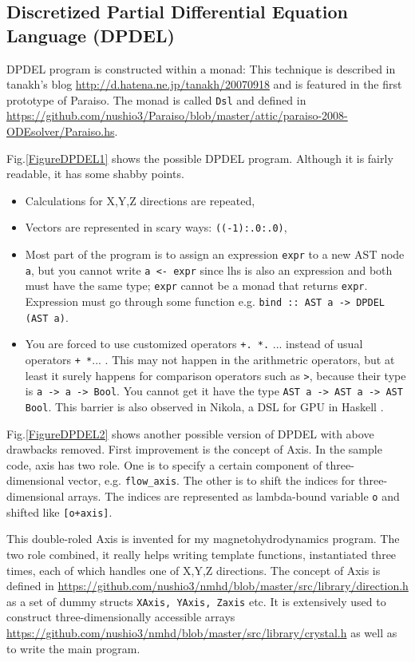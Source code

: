 \documentclass[twocolumn]{article}
\begin{document}
\subsection{Discretized Partial Differential Equation Language (DPDEL)}

DPDEL program is constructed within a monad: This technique is
described in tanakh's blog \url{http://d.hatena.ne.jp/tanakh/20070918}
and is featured in the first prototype of Paraiso. The monad is called
{\tt Dsl} and defined in
\url{https://github.com/nushio3/Paraiso/blob/master/attic/paraiso-2008-ODEsolver/Paraiso.hs}.


Fig.\ref{FigureDPDEL1} shows the possible DPDEL program. Although it is fairly
readable, it has some shabby points.
\begin{itemize}
  \item Calculations for X,Y,Z directions are repeated,
  \item Vectors are represented in scary ways: {\tt ((-1):.0:.0)},
  \item Most part of the program is to assign an expression {\tt expr} to a
    new AST node {\tt a}, but you cannot write {\tt a <- expr} since lhs is
    also an expression and both must have the same type; {\tt expr} cannot be
    a monad that returns {\tt expr}.  Expression must go through some function
    e.g. {\tt bind :: AST a -> DPDEL (AST a)}.
  \item You are forced to use customized operators {\tt+. *.} ... instead of
    usual operators {\tt+ *}... . This may not happen in the arithmetric
    operators, but at least it surely happens for comparison operators such as
    {\tt>}, because their type is {\tt a -> a -> Bool}. You cannot get it have
    the type {\tt AST a -> AST a -> AST Bool}. This barrier is also observed
    in Nikola, a DSL for GPU in Haskell
    \cite{Mainland:2010:NEC:1863523.1863533}.
\end{itemize}

Fig.\ref{FigureDPDEL2} shows another possible version of DPDEL with
above drawbacks removed.  First improvement is the concept of Axis. In
the sample code, axis has two role.  One is to specify a certain
component of three-dimensional vector, e.g. {\tt flow\_axis}. The
other is to shift the indices for three-dimensional arrays. The
indices are represented as lambda-bound variable {\tt o} and shifted
like {\tt [o+axis]}.

This double-roled Axis is invented for my magnetohydrodynamics
program. The two role combined, it really helps writing template
functions, instantiated three times, each of which handles one of
X,Y,Z directions. The concept of Axis is defined in
\url{https://github.com/nushio3/nmhd/blob/master/src/library/direction.h}
as a set of dummy structs {\tt XAxis, YAxis, Zaxis} etc. It is
extensively used to construct three-dimensionally accessible arrays
\url{https://github.com/nushio3/nmhd/blob/master/src/library/crystal.h}
as well as to write the main program.
\end{document}
